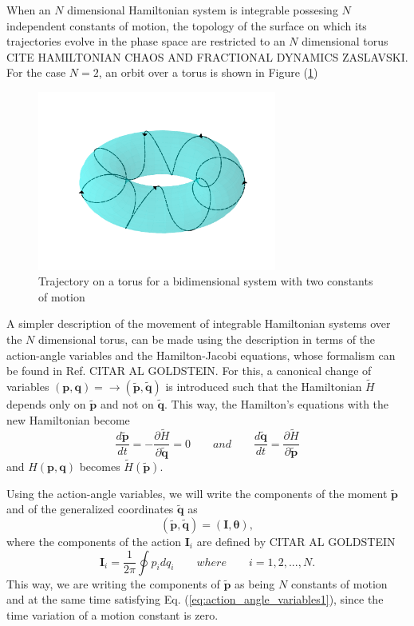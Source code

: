 When an $N$ dimensional Hamiltonian system is integrable possesing $N$ independent constants of motion, the topology of the surface on which its trajectories evolve in the phase space are restricted to an $N$ dimensional torus CITE HAMILTONIAN CHAOS AND FRACTIONAL DYNAMICS ZASLAVSKI. For the case $N=2$, an orbit over a torus is shown in Figure (\ref{fig:trajectory_torus})

\begin{figure}[H]
\centering
\includegraphics[width=0.7\textwidth]{Figures/trajectory_torus.png}
\caption{Trajectory on a torus for a bidimensional system with two constants of motion}
\label{fig:trajectory_torus}
\end{figure}

A simpler description of the movement of integrable Hamiltonian systems over the $N$ dimensional torus, can be made using the description in terms of the action-angle variables and the Hamilton-Jacobi equations, whose formalism can be found in Ref. CITAR AL GOLDSTEIN. For this, a canonical change of variables $(\bm{p},\bm{q})=\rightarrow (\tilde{\bm{p}},\tilde{\bm{q}})$ is introduced such that the Hamiltonian $\tilde{H}$ depends only on $\tilde{\bm{p}}$ and not on $\tilde{\bm{q}}$. This way, the Hamilton's equations with the new Hamiltonian become
\begin{equation}
\frac{d\tilde{\bm{p}}}{dt}= -\frac{\partial \tilde{H}}{\partial \tilde{\bm{q}}}=0  \qquad and \qquad  
\frac{d\tilde{\bm{q}}}{dt}= \frac{\partial \tilde{H}}{\partial \tilde{\bm{p}}}
\label{eq:action_angle_variables1}
\end{equation}
and $H(\bm{p},\bm{q})$ becomes $\tilde{H}(\tilde{\bm{p}})$.\par


Using the action-angle variables, we will write the components of the moment $\tilde{\bm{p}}$ and of the generalized coordinates $\tilde{\bm{q}}$ as
\begin{equation}
(\tilde{\bm{p}},\tilde{\bm{q}})=(\bm{I},\bm{\theta}),
\end{equation}
where the components of the action $\bm{I}_i$ are defined by CITAR AL GOLDSTEIN
\begin{equation}
\bm{I}_i=\frac{1}{2\pi}\oint p_idq_i \qquad where \qquad i=1,2,...,N.
\end{equation}
This way, we are writing the components of $\tilde{\bm{p}}$ as being $N$ constants of motion and at the same time satisfying Eq. (\ref{eq:action_angle_variables1}), since the time variation of a motion constant is zero.\par

